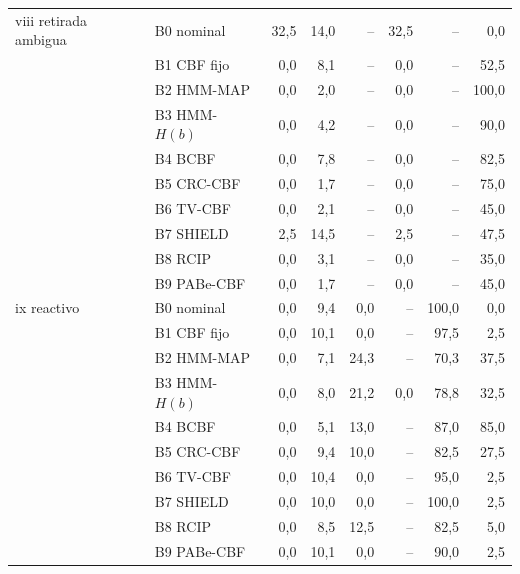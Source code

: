 \begin{table}[!t]
{\begin{tabular}{llrrrrrr}
viii retirada ambigua & B0 nominal & 32{,}5 & 14{,}0 & -- & 32{,}5 & -- & 0{,}0 \\
 & B1 CBF fijo & 0{,}0 & 8{,}1 & -- & 0{,}0 & -- & 52{,}5 \\
 & B2 HMM-MAP & 0{,}0 & 2{,}0 & -- & 0{,}0 & -- & 100{,}0 \\
 & B3 HMM-$H(b)$ & 0{,}0 & 4{,}2 & -- & 0{,}0 & -- & 90{,}0 \\
 & B4 BCBF & 0{,}0 & 7{,}8 & -- & 0{,}0 & -- & 82{,}5 \\
 & B5 CRC-CBF & 0{,}0 & 1{,}7 & -- & 0{,}0 & -- & 75{,}0 \\
 & B6 TV-CBF & 0{,}0 & 2{,}1 & -- & 0{,}0 & -- & 45{,}0 \\
 & B7 SHIELD & 2{,}5 & 14{,}5 & -- & 2{,}5 & -- & 47{,}5 \\
 & B8 RCIP & 0{,}0 & 3{,}1 & -- & 0{,}0 & -- & 35{,}0 \\
 & B9 PABe-CBF & 0{,}0 & 1{,}7 & -- & 0{,}0 & -- & 45{,}0 \\
\midrule
ix reactivo & B0 nominal & 0{,}0 & 9{,}4 & 0{,}0 & -- & 100{,}0 & 0{,}0 \\
 & B1 CBF fijo & 0{,}0 & 10{,}1 & 0{,}0 & -- & 97{,}5 & 2{,}5 \\
 & B2 HMM-MAP & 0{,}0 & 7{,}1 & 24{,}3 & -- & 70{,}3 & 37{,}5 \\
 & B3 HMM-$H(b)$ & 0{,}0 & 8{,}0 & 21{,}2 & 0{,}0 & 78{,}8 & 32{,}5 \\
 & B4 BCBF & 0{,}0 & 5{,}1 & 13{,}0 & -- & 87{,}0 & 85{,}0 \\
 & B5 CRC-CBF & 0{,}0 & 9{,}4 & 10{,}0 & -- & 82{,}5 & 27{,}5 \\
 & B6 TV-CBF & 0{,}0 & 10{,}4 & 0{,}0 & -- & 95{,}0 & 2{,}5 \\
 & B7 SHIELD & 0{,}0 & 10{,}0 & 0{,}0 & -- & 100{,}0 & 2{,}5 \\
 & B8 RCIP & 0{,}0 & 8{,}5 & 12{,}5 & -- & 82{,}5 & 5{,}0 \\
 & B9 PABe-CBF & 0{,}0 & 10{,}1 & 0{,}0 & -- & 90{,}0 & 2{,}5 \\
\bottomrule
\end{tabular}}
\end{table}
